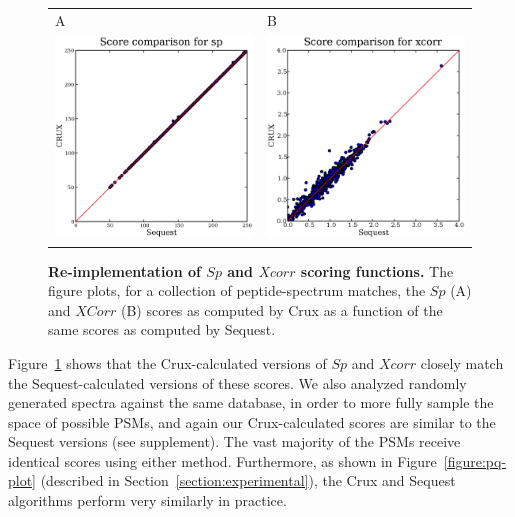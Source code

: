 \documentclass[12pt]{article}
\begin{document}
\begin{figure}
  \centering
  \begin{tabular}{ll}
    {\sf A} & {\sf B}\\
    \includegraphics[width=3in]{./Images/random-sp.eps} &
    \includegraphics[width=3in]{./Images/random-xcorr.eps} \\
  \end{tabular}
  \caption{{\bf Re-implementation of $Sp$ and $Xcorr$ scoring functions.}
  The figure plots, for a collection of peptide-spectrum matches, the
  $Sp$ ({\sf A}) and $XCorr$ ({\sf B}) scores as computed by Crux as a function of the
  same scores as computed by {\sc Sequest}.
  \label{figure:sp-xcorr}}
\end{figure}
Figure~\ref{figure:sp-xcorr} shows that the Crux-calculated versions
of $Sp$ and $Xcorr$ closely match the {\sc Sequest}-calculated
versions of these scores. We also analyzed randomly generated spectra
against the same database, in order to more fully sample the space of 
possible PSMs, and again our Crux-calculated scores are similar to the {\sc Sequest} versions (see supplement). The vast majority of the PSMs receive
identical scores using either method.  Furthermore, as shown in
Figure~\ref{figure:pq-plot} (described in
Section~\ref{section:experimental}), the Crux and {\sc Sequest}
algorithms perform very similarly in practice. 
\end{document}
